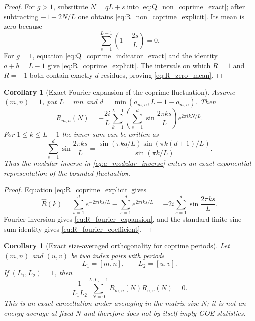 \documentclass[11pt]{amsart}
\numberwithin{equation}{section}
\theoremstyle{plain}
\newtheorem{corollary}[theorem]{Corollary}
\theoremstyle{definition}
\theoremstyle{remark}
\begin{document}
\begin{proof}
For $g>1$, substitute $N=qL+s$ into \eqref{eq:Q_non_coprime_exact}; after subtracting $-1+2N/L$ one obtains \eqref{eq:R_non_coprime_explicit}.  Its mean is zero because
\begin{equation}
\sum_{s=1}^{L-1}\left(1-\frac{2s}{L}\right)=0.
\end{equation}
For $g=1$, equation \eqref{eq:Q_coprime_indicator_exact} and the identity $a+b=L-1$ give \eqref{eq:R_coprime_explicit}.  The intervals on which $R=1$ and $R=-1$ both contain exactly $d$ residues, proving \eqref{eq:R_zero_mean}.
\end{proof}

\begin{corollary}[Exact Fourier expansion of the coprime fluctuation]
\label{cor:R_fourier}
Assume $(m,n)=1$, put $L=mn$ and $d=\min(a_{m,n},L-1-a_{m,n})$.  Then
\begin{equation}
R_{m,n}(N)
=-\frac{2i}{L}\sum_{k=1}^{L-1}
\left(\sum_{s=1}^{d}\sin\frac{2\pi ks}{L}\right)
 e^{2\pi i kN/L}.
\label{eq:R_fourier_expansion}
\end{equation}
For $1\le k\le L-1$ the inner sum can be written as
\begin{equation}
\sum_{s=1}^{d}\sin\frac{2\pi ks}{L}
=
\frac{
\sin(\pi kd/L)\sin(\pi k(d+1)/L)
}{\sin(\pi k/L)}.
\label{eq:R_fourier_coefficient}
\end{equation}
Thus the modular inverse in \eqref{eq:a_modular_inverse} enters an exact exponential representation of the bounded fluctuation.
\end{corollary}

\begin{proof}
Equation \eqref{eq:R_coprime_explicit} gives
\begin{equation}
\widehat R(k)
=\sum_{s=1}^{d}e^{-2\pi iks/L}
 -\sum_{s=1}^{d}e^{2\pi iks/L}
=-2i\sum_{s=1}^{d}\sin\frac{2\pi ks}{L}.
\end{equation}
Fourier inversion gives \eqref{eq:R_fourier_expansion}, and the standard finite sine-sum identity gives \eqref{eq:R_fourier_coefficient}.
\end{proof}

\begin{corollary}[Exact size-averaged orthogonality for coprime periods]
\label{cor:R_period_orthogonality}
Let $(m,n)$ and $(u,v)$ be two index pairs with periods
\begin{equation}
L_1=[m,n],
\qquad L_2=[u,v].
\end{equation}
If $(L_1,L_2)=1$, then
\begin{equation}
\frac1{L_1L_2}
\sum_{N=0}^{L_1L_2-1}
R_{m,n}(N)R_{u,v}(N)=0.
\label{eq:R_period_orthogonality}
\end{equation}
This is an exact cancellation under averaging in the matrix size $N$; it is not an energy average at fixed $N$ and therefore does not by itself imply GOE statistics.
\end{corollary}
\end{document}
